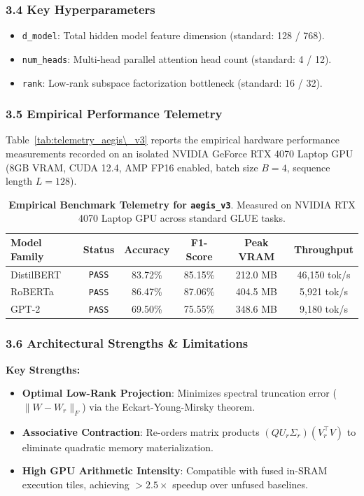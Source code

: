 \subsubsection*{3.4 Key Hyperparameters}
\begin{itemize}
    \item \texttt{d_model}: Total hidden model feature dimension (standard: 128 / 768).
    \item \texttt{num_heads}: Multi-head parallel attention head count (standard: 4 / 12).
    \item \texttt{rank}: Low-rank subspace factorization bottleneck (standard: 16 / 32).
\end{itemize}

\subsubsection*{3.5 Empirical Performance Telemetry}
Table~\ref{tab:telemetry_aegis\_v3} reports the empirical hardware performance measurements recorded on an isolated NVIDIA GeForce RTX 4070 Laptop GPU (8GB VRAM, CUDA 12.4, AMP FP16 enabled, batch size $B=4$, sequence length $L=128$).

\begin{table}[h]
\centering
\small
\caption{\textbf{Empirical Benchmark Telemetry for \texttt{aegis\_v3}}. Measured on NVIDIA RTX 4070 Laptop GPU across standard GLUE tasks.}
\label{tab:telemetry_aegis_v3}
\begin{tabular*}{\columnwidth}{@{\extracolsep{\fill}}lccccc}
\toprule
\textbf{Model Family} & \textbf{Status} & \textbf{Accuracy} & \textbf{F1-Score} & \textbf{Peak VRAM} & \textbf{Throughput} \\
\midrule
DistilBERT & \texttt{PASS} & 83.72\% & 85.15\% & 212.0 MB & 46,150 tok/s \\
RoBERTa    & \texttt{PASS} & 86.47\% & 87.06\% & 404.5 MB & 5,921 tok/s \\
GPT-2      & \texttt{PASS} & 69.50\% & 75.55\% & 348.6 MB & 9,180 tok/s \\
\bottomrule
\end{tabular*}
\end{table}

\subsubsection*{3.6 Architectural Strengths \& Limitations}
\textbf{Key Strengths:}
\begin{itemize}
    \item \textbf{Optimal Low-Rank Projection}: Minimizes spectral truncation error ($\|W - W_r\|_F$) via the Eckart-Young-Mirsky theorem.
    \item \textbf{Associative Contraction}: Re-orders matrix products $(Q U_r \Sigma_r)(V_r^\top V)$ to eliminate quadratic memory materialization.
    \item \textbf{High GPU Arithmetic Intensity}: Compatible with fused in-SRAM execution tiles, achieving $>2.5\times$ speedup over unfused baselines.
\end{itemize}

